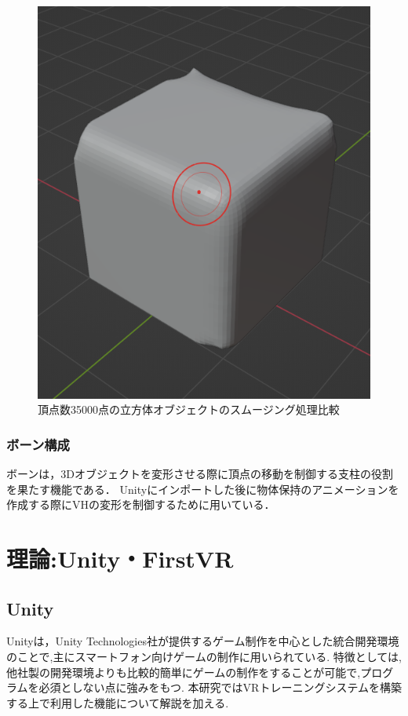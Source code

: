 \documentclass{ltjsreport}
\begin{document}
\begin{figure}[H]
\begin{minipage}{0.4\columnwidth}
			\includegraphics[width = \columnwidth]{../figs/SmoothingAfterCube.png}
			\end{minipage}
			\caption{頂点数35000点の立方体オブジェクトのスムージング処理比較}
			\end{figure}
		\subsection{ボーン構成}
			ボーンは，3Dオブジェクトを変形させる際に頂点の移動を制御する支柱の役割を果たす機能である．
			Unityにインポートした後に物体保持のアニメーションを作成する際にVHの変形を制御するために用いている．


\chapter{理論:Unity・FirstVR}
	\section{Unity}
		Unityは，Unity Technologies社が提供するゲーム制作を中心とした統合開発環境のことで,主にスマートフォン向けゲームの制作に用いられている.
		特徴としては,他社製の開発環境よりも比較的簡単にゲームの制作をすることが可能で,プログラムを必須としない点に強みをもつ.
		本研究ではVRトレーニングシステムを構築する上で利用した機能について解説を加える.
\end{document}
